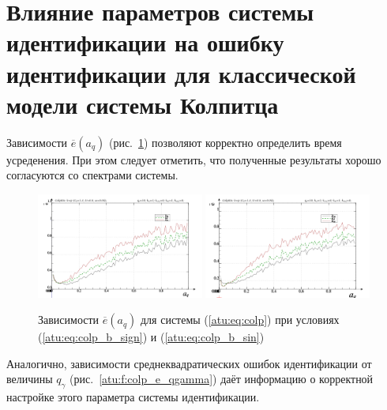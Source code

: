 
\section{Влияние параметров системы идентификации на ошибку идентификации для классической модели системы Колпитца}  %

Зависимости $\overline{e}(a_q)$ (рис.~\ref{atu:f:colp_e_a_q})
позволяют корректно определить время усреденения.
При этом следует отметить, что
полученные результаты хорошо согласуются со спектрами системы.

\begin{figure}[htb!]
\centerline{
  \includegraphics[width=0.49\textwidth]{p/mod/colp_m5p-p_a_q_e_sign.png}
  \includegraphics[width=0.49\textwidth]{p/mod/colp_m5p-p_a_q_e_sin.png}
}
  \caption{Зависимости  $\overline{e}(a_q)$ для системы (\ref{atu:eq:colp})
  при условиях (\ref{atu:eq:colp_b_sign}) и (\ref{atu:eq:colp_b_sin})
}
\label{atu:f:colp_e_a_q}
\end{figure}

Аналогично, зависимости среднеквадратических ошибок идентификации от величины $q_\gamma$ (рис.~\ref{atu:f:colp_e_qgamma})
даёт информацию о корректной настройке этого параметра системы идентификации.

